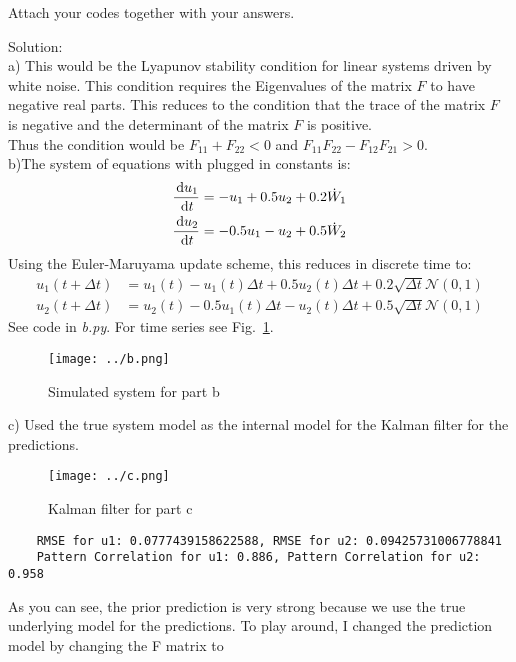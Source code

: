 \documentclass[a4paper,notitlepage,cs4size,cap,indent,oneside,12pt]{article}
\numberwithin{equation}{section}
\numberwithin{figure}{section}
\newcommand{\blue}{\color{blue}}
\begin{document}
\noindent Attach your codes together with your answers.

{\blue
\noindent Solution: \\
a) This would be the Lyapunov stability condition for linear systems driven by white noise. This condition requires the Eigenvalues of the matrix $F$ to have negative real parts. This reduces to the condition that the trace of the matrix $F$ is negative and the determinant of the matrix $F$ is positive. \\
Thus the condition would be $F_{11} + F_{22} < 0$ and $F_{11}F_{22} - F_{12}F_{21} > 0$.\\
b)The system of equations with plugged in constants is:
\begin{equation*}
    \begin{split}
        \frac{{\, \rm d} u_1}{{\, \rm d} t} &= -u_1 + 0.5u_2 + 0.2\dot{W}_1\\
        \frac{{\, \rm d} u_2}{{\, \rm d} t} &= -0.5u_1 - u_2 + 0.5\dot{W}_2
    \end{split}
\end{equation*}
Using the Euler-Maruyama update scheme, this reduces in discrete time to:
\begin{align*}
    u_1(t+\Delta{t}) &= u_1(t) - u_1(t)\Delta{t} + 0.5u_2(t)\Delta{t} + 0.2\sqrt{\Delta{t}}\mathcal{N}(0,1)\\
    u_2(t+\Delta{t}) &= u_2(t) - 0.5u_1(t)\Delta{t} - u_2(t)\Delta{t} + 0.5\sqrt{\Delta{t}}\mathcal{N}(0,1)
\end{align*}
See code in \textit{b.py}. For time series see Fig.~\ref{fig:b}.\\
\begin{figure}[H]
    \centering
    \texttt{[image: ../b.png]}
    \caption{Simulated system for part b}
    \label{fig:b}
\end{figure}
c) Used the true system model as the internal model for the Kalman filter for the predictions.
\begin{figure}[H]
    \centering
    \texttt{[image: ../c.png]}
    \caption{Kalman filter for part c}
    \label{fig:c}
\end{figure}
\begin{verbatim}
    RMSE for u1: 0.0777439158622588, RMSE for u2: 0.09425731006778841
    Pattern Correlation for u1: 0.886, Pattern Correlation for u2: 0.958
\end{verbatim}
As you can see, the prior prediction is very strong because we use the true underlying model for the predictions. To play around, I changed the prediction model by changing the F matrix to 
}
\end{document}
